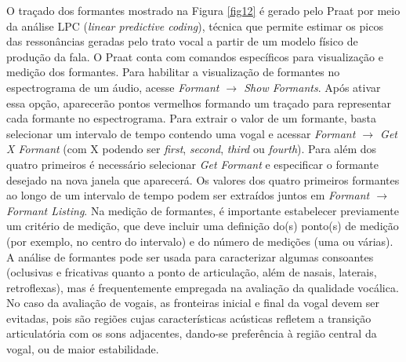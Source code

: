 \documentclass[portuguese]{textolivre}
\begin{document}
O traçado dos formantes mostrado na Figura \ref{fig12} é gerado pelo Praat por meio da análise LPC (\textit{linear predictive coding}), técnica que permite estimar os picos das ressonâncias geradas pelo trato vocal a partir de um modelo físico de produção da fala. O Praat conta com comandos específicos para visualização e medição dos formantes. Para habilitar a visualização de formantes no espectrograma de um áudio, acesse \textit{Formant $\rightarrow$ Show Formants}. Após ativar essa opção, aparecerão pontos vermelhos formando um traçado para representar cada formante no espectrograma. Para extrair o valor de um formante, basta selecionar um intervalo de tempo contendo uma vogal e acessar \textit{Formant $\rightarrow$ Get X Formant} (com X podendo ser \textit{first}, \textit{second}, \textit{third} ou \textit{fourth}). Para além dos quatro primeiros é necessário selecionar \textit{Get Formant} e especificar o formante desejado na nova janela que aparecerá. Os valores dos quatro primeiros formantes ao longo de um intervalo de tempo podem ser extraídos juntos em \textit{Formant $\rightarrow$ Formant Listing}. Na medição de formantes, é importante estabelecer previamente um critério de medição, que deve incluir uma definição do(s) ponto(s) de medição (por exemplo, no centro do intervalo) e do número de medições (uma ou várias). A análise de formantes pode ser usada para caracterizar algumas consoantes (oclusivas e fricativas quanto a ponto de articulação, além de nasais, laterais, retroflexas), mas é frequentemente empregada na avaliação da qualidade vocálica. No caso da avaliação de vogais, as fronteiras inicial e final da vogal devem ser evitadas, pois são regiões cujas características acústicas refletem a transição articulatória com os sons adjacentes, dando-se preferência à região central da vogal, ou de maior estabilidade.  
\end{document}
